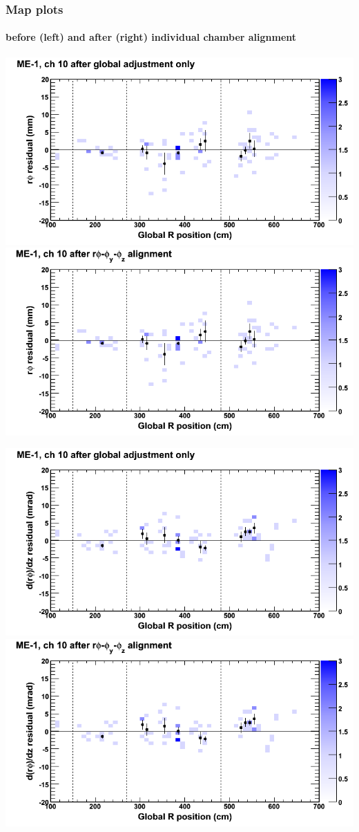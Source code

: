 \documentclass[compress]{beamer}
\begin{document}
\begin{frame}
\frametitle{Map plots}
\framesubtitle{before (left) and after (right) individual chamber alignment}
\includegraphics[width=0.5\linewidth]{ringmapplots_3dof/before_CSCvsr_mem1ch10_x.png} \includegraphics[width=0.5\linewidth]{ringmapplots_3dof/after_CSCvsr_mem1ch10_x.png}

\includegraphics[width=0.5\linewidth]{ringmapplots_3dof/before_CSCvsr_mem1ch10_dxdz.png} \includegraphics[width=0.5\linewidth]{ringmapplots_3dof/after_CSCvsr_mem1ch10_dxdz.png}
\end{frame}
\end{document}
